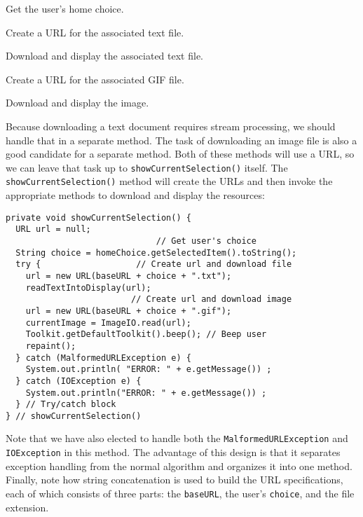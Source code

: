 \begin{BL}
\item  Get the user's home choice.
\item  Create a URL for the associated text file.
\item  Download and display the associated text file.
\item  Create a URL for the associated GIF file.
\item  Download and display the image.
\end{BL}

\noindent Because downloading a text document requires stream
processing, we should handle that in a separate method.  The task of
downloading an image file is also a good candidate for a separate
method.  Both of these methods will use a URL, so we can leave that
task up to {\tt showCurrent\-Selection()} itself.  The
{\tt showCurrentSelection()} method will create the URLs and then invoke
the appropriate methods to download and display the resources:

\begin{jjjlisting}[28pc]
\begin{lstlisting}
private void showCurrentSelection() {
  URL url = null;
                              // Get user's choice
  String choice = homeChoice.getSelectedItem().toString();     
  try {                   // Create url and download file         
    url = new URL(baseURL + choice + ".txt");
    readTextIntoDisplay(url);          
                         // Create url and download image
    url = new URL(baseURL + choice + ".gif"); 
    currentImage = ImageIO.read(url);
    Toolkit.getDefaultToolkit().beep(); // Beep user
    repaint();
  } catch (MalformedURLException e) {
    System.out.println( "ERROR: " + e.getMessage()) ;
  } catch (IOException e) {
    System.out.println("ERROR: " + e.getMessage()) ;
  } // Try/catch block
} // showCurrentSelection()
\end{lstlisting}
\end{jjjlisting}

\noindent Note that we have also elected to handle both the
{\tt MalformedURLException} and {\tt IOException} in this method.  The
advantage of this design is that it separates exception handling from the
normal algorithm and organizes it into one method.  Finally, note how
string concatenation is used to build the URL specifications,
each of which consists of three parts: the {\tt baseURL}, the
user's {\tt choice}, and the file extension.

